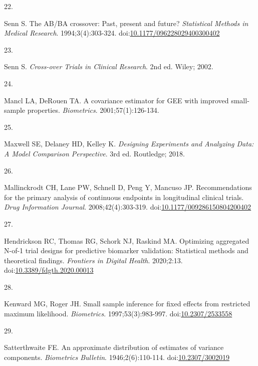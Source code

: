 \documentclass[
  11pt,
]{article}
\newlength{\cslhangindent}
\newlength{\csllabelwidth}
\newenvironment{CSLReferences}[2] %
 {\begin{list}{}{%
  \setlength{\itemindent}{0pt}
  \setlength{\leftmargin}{0pt}
  \setlength{\parsep}{0pt}
  \ifodd #1
   \setlength{\leftmargin}{\cslhangindent}
   \setlength{\itemindent}{-1\cslhangindent}
  \fi
  \setlength{\itemsep}{#2\baselineskip}}}
 {\end{list}}
\newcommand{\CSLLeftMargin}[1]{\parbox[t]{\csllabelwidth}{\strut#1\strut}}
\newcommand{\CSLRightInline}[1]{\parbox[t]{\linewidth - \csllabelwidth}{\strut#1\strut}}
\begin{document}
\begin{CSLReferences}{0}{1}
\CSLLeftMargin{22. }%
\CSLRightInline{Senn S. The {AB/BA} crossover: Past, present and future? \emph{Statistical Methods in Medical Research}. 1994;3(4):303-324. doi:\href{https://doi.org/10.1177/096228029400300402}{10.1177/096228029400300402}}

\CSLLeftMargin{23. }%
\CSLRightInline{Senn S. \emph{Cross-over Trials in Clinical Research}. 2nd ed. Wiley; 2002.}

\CSLLeftMargin{24. }%
\CSLRightInline{Mancl LA, DeRouen TA. A covariance estimator for {GEE} with improved small-sample properties. \emph{Biometrics}. 2001;57(1):126-134.}

\CSLLeftMargin{25. }%
\CSLRightInline{Maxwell SE, Delaney HD, Kelley K. \emph{Designing Experiments and Analyzing Data: A Model Comparison Perspective}. 3rd ed. Routledge; 2018.}

\CSLLeftMargin{26. }%
\CSLRightInline{Mallinckrodt CH, Lane PW, Schnell D, Peng Y, Mancuso JP. Recommendations for the primary analysis of continuous endpoints in longitudinal clinical trials. \emph{Drug Information Journal}. 2008;42(4):303-319. doi:\href{https://doi.org/10.1177/009286150804200402}{10.1177/009286150804200402}}

\CSLLeftMargin{27. }%
\CSLRightInline{Hendrickson RC, Thomas RG, Schork NJ, Raskind MA. Optimizing aggregated {N}-of-1 trial designs for predictive biomarker validation: Statistical methods and theoretical findings. \emph{Frontiers in Digital Health}. 2020;2:13. doi:\href{https://doi.org/10.3389/fdgth.2020.00013}{10.3389/fdgth.2020.00013}}

\CSLLeftMargin{28. }%
\CSLRightInline{Kenward MG, Roger JH. Small sample inference for fixed effects from restricted maximum likelihood. \emph{Biometrics}. 1997;53(3):983-997. doi:\href{https://doi.org/10.2307/2533558}{10.2307/2533558}}

\CSLLeftMargin{29. }%
\CSLRightInline{Satterthwaite FE. An approximate distribution of estimates of variance components. \emph{Biometrics Bulletin}. 1946;2(6):110-114. doi:\href{https://doi.org/10.2307/3002019}{10.2307/3002019}}

\end{CSLReferences}
\end{document}
